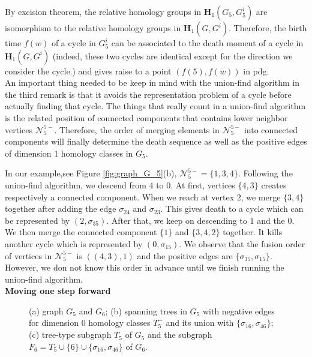 \documentclass[a4paper,12pt]{article}
\numberwithin{equation}{section}
\begin{document}
	By excision theorem, the relative homology groups in $\mathbf{H}_1(G_5,G_5^i)$ are isomorphism to the relative homology groups in $\mathbf{H}_1(G, G^i)$. Therefore, the birth time $f(w)$ of a cycle in $G^{i}_5$ can be associated to the death moment of a cycle in $\mathbf{H}_1(G, G^i)$ (indeed, these two cycles are identical except for the direction we consider the cycle.) and gives raise to a point $(f(5), f(w))$ in pdg. \\
	
	
	
	An important thing needed to be keep in mind with the union-find algorithm in the third remark is that it avoids the representation problem of a cycle before actually finding that cycle. The things that really count in a union-find algorithm is the related position of connected components that contains lower neighbor vertices $\mathcal{N}_5^{5-}$. Therefore, the order of merging elements in $\mathcal{N}_5^{5-}$ into connected components will finally determine the death sequence as well as the positive edges of dimension 1 homology classes in $G_5$.
	
	In our example,see Figure \ref{fig:graph_G_5}(b), $\mathcal{N}^{5-}_5 = \{1,3,4\}$. Following the union-find algorithm, we descend from $4$ to $0$. At first, vertices $\{4,3\}$ creates respectively a connected component. When we reach at vertex $2$, we merge $\{3,4\}$ together after adding the edge $\sigma_{24}$ and $\sigma_{23}$. This gives death to a cycle which can be represented by $(2, \sigma_{35})$. After that, we keep on descending to $1$ and the $0$. We then merge the connected component $\{1\}$ and $\{3,4,2\}$ together. It kills another cycle which is represented by $(0, \sigma_{15})$. We observe that the fusion order of vertices in $\mathcal{N}^{5-}_5$ is $((4,3),1)$ and the positive edges are $\{\sigma_{35}, \sigma_{15} \}$. However, we don not know this order in advance until we finish running the union-find algorithm. \\

		
	\noindent
	\textbf{Moving one step forward}\\
		
	\begin{figure}[!hbtp]
		\centering				
		\caption{(a) graph $G_5$ and $G_6$; (b) spanning trees in $G_5$ with negative edges for dimension 0 homology classes $T^{-}_5$ and its union with $\{ \sigma_{16}, \sigma_{46} \}$; (c) tree-type subgraph $T_5$ of $G_5$ and the subgraph $F_6 = T_5 \cup \{6 \} \cup \{ \sigma_{16}, \sigma_{46} \}$ of $G_6$.}
		\label{fig:graph_F_6}		
	\end{figure}
	
\end{document}

